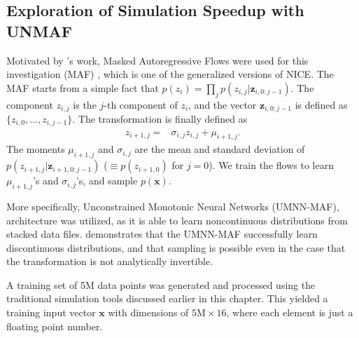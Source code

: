 \subsection{Exploration of Simulation Speedup with UNMAF}

    Motivated by \parencite{Weisser2021ThePhysics}'s work, Masked Autoregressive Flows were used for this investigation (MAF)  \parencite{Papamakarios2017MaskedEstimation}, which is one of the generalized versions of NICE. The MAF starts from a simple fact that $p(z_{i}) = \prod\limits_{j}p(z_{i,j}|\mathbf{z}_{i,0:j-1})$. The component $z_{i,j}$ is the $j$-th component of $z_i$, and the vector $\mathbf{z}_{i,0:j-1}$ is defined as $\{z_{i, 0}, ..., z_{i, j-1}\}$. The transformation is finally defined as
    \begin{align}
        z_{i+1, j}=& \sigma_{i, j} z_{i, j} + \mu_{i+1, j}.
    \end{align}
    The moments $\mu_{i+1, j}$ and $\sigma_{i, j}$ are the mean and standard deviation of $p(z_{i+1,j}|\mathbf{z}_{i+1,0:j-1})$ ($\equiv p(z_{i+1,0})$ for $j=0$). We train the flows to learn $\mu_{i+1, j}$'s and $\sigma_{i, j}$'s, and sample $p(\mathbf{x})$. 

    More specifically, Unconstrained Monotonic Neural Networks (UMNN-MAF), \parencite{Wehenkel2019UnconstrainedNetworks}  architecture was utilized, as it is able to learn noncontinuous distributions from stacked data files. \parencite{Wehenkel2019UnconstrainedNetworks} demonstrates that the UMNN-MAF successfully learn discontinuous distributions, and that sampling is possible even in the case that the transformation is not analytically invertible.
    
    A training set of 5M data points was generated and processed using the traditional simulation tools discussed earlier in this chapter. This yielded a training input vector $\mathbf{x}$ with dimensions of $5\text{M}\times16$, where each element is just a floating point number.

